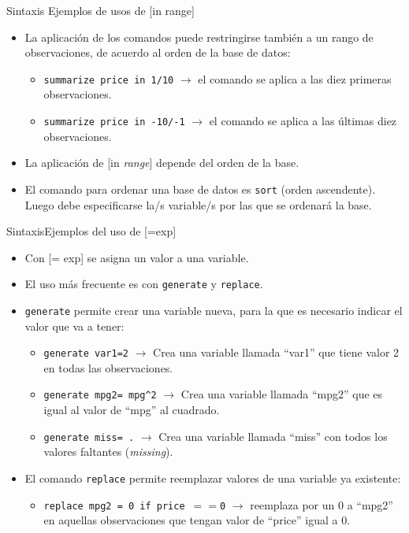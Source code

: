 \documentclass{beamer}
\begin{document}
\begin{frame}{Sintaxis} {Ejemplos de usos de [in range]}
\begin{itemize}
\item La aplicación de los comandos puede restringirse también a un rango de observaciones, de acuerdo al orden de la base de datos:
\begin{itemize}
\item  \texttt{summarize price in 1/10}  \hspace{0.3 cm} $\rightarrow$ el comando se aplica a las diez primeras observaciones.
\item  \texttt{summarize price in -10/-1} \hspace{0.3 cm} $\rightarrow$ el comando se aplica a las últimas diez observaciones.
\end{itemize}
\item La aplicación de [in \textit{range}] depende del orden de la base.
\item El comando para ordenar una base de datos es \texttt{sort} (orden ascendente). Luego debe especificarse la/s variable/s por las que se ordenará la base.
\end{itemize}
\end{frame}


\begin{frame}{Sintaxis}{Ejemplos del uso de [=exp]}
\begin{itemize}
\item Con [= exp] se asigna un valor a una variable.
\item El uso más frecuente es con \texttt{generate} y \texttt{replace}.
\item \texttt{generate} permite crear una variable nueva, para la que es necesario indicar el valor que va a tener:
\begin{itemize}
\item \texttt{generate var1=2} \hspace{0.3 cm} $\rightarrow$ Crea una variable llamada ``var1'' que tiene valor 2 en todas las observaciones.
\item \texttt{generate mpg2= mpg\^{}2}  \hspace{0.3 cm} $\rightarrow$ Crea una variable llamada ``mpg2'' que es igual al valor de ``mpg'' al cuadrado.
\item  \texttt{generate miss= .}  \hspace{0.3 cm} $\rightarrow$ Crea una variable llamada ``miss'' con todos los valores faltantes (\textit{missing}).
\end{itemize}
\item El comando \texttt{replace} permite reemplazar valores de una variable ya existente:
\begin{itemize}
\item \texttt{replace mpg2 = 0 if price $==$0}  \hspace{0.3 cm} $\rightarrow$  reemplaza por un 0 a ``mpg2'' en aquellas observaciones que tengan valor de ``price'' igual a 0.
\end{itemize}
\end{itemize}
\end{frame}
\end{document}
